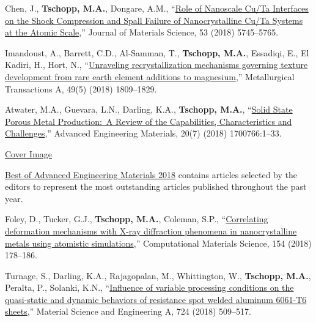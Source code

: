 \begin{cvlist}
\item
{Chen, J.}, \textbf{Tschopp, M.A.}, Dongare, A.M., ``\href{https://doi.org/10.1007/s10853-017-1879-7}{Role of Nanoscale Cu/Ta Interfaces on the Shock Compression and Spall Failure of Nanocrystalline Cu/Ta Systems at the Atomic Scale},'' Journal of Materials Science, 53 (2018) 5745--5765.

\item
{Imandoust, A.}, {Barrett, C.D.}, Al-Samman, T., \textbf{Tschopp, M.A.}, Essadiqi, E., El Kadiri, H., Hort, N., ``\href{https://www.springerprofessional.de/en/unraveling-recrystallization-mechanisms-governing-texture-develo/15502294}{Unraveling recrystallization mechanisms governing texture development from rare earth element additions to magnesium},'' Metallurgical Transactions A, 49(5) (2018) 1809--1829.

\item
Atwater, M.A., Guevara, L.N., Darling, K.A., \textbf{Tschopp, M.A.}, ``\href{http://dx.doi.org/10.1002/adem.201700766}{Solid State Porous Metal Production:~A Review of the Capabilities, Characteristics and Challenges},'' Advanced Engineering Materials, 20(7) (2018) 1700766:1--33.
\begin{list2}
\item[$\star$] \href{https://onlinelibrary.wiley.com/doi/abs/10.1002/adem.201870019}{Cover Image}
\item[$\star$] \href{https://onlinelibrary.wiley.com/page/journal/15272648/homepage/best-of-advanced-engineering-materials-2018.html}{Best of Advanced Engineering Materials 2018} contains articles selected by the editors to represent the most outstanding articles published throughout the past year.
\end{list2}

\item
{Foley, D.}, Tucker, G.J., \textbf{Tschopp, M.A.}, Coleman, S.P., ``\href{https://doi.org/10.1016/j.commatsci.2018.07.056}{Correlating deformation mechanisms with X-ray diffraction phenomena in nanocrystalline metals using atomistic simulations},'' Computational Materials Science, 154 (2018) 178--186.

\item
{Turnage, S.}, Darling, K.A., {Rajagopalan, M.}, Whittington, W., \textbf{Tschopp, M.A.}, Peralta, P., Solanki, K.N., ``\href{https://doi.org/10.1016/j.msea.2018.03.120}{Influence of variable processing conditions on the quasi-static and dynamic behaviors of resistance spot welded aluminum 6061-T6 sheets},'' Material Science and Engineering A, 724 (2018) 509--517.


\end{cvlist}
